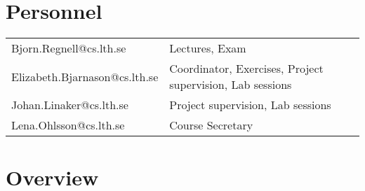 \documentclass[10pt,a4paper]{article}
\begin{document}
\section{Personnel}
\begin{flushleft}
\setlength{\tabcolsep}{0pt}
\begin{tabular}{p{} p{}}
Bjorn.Regnell@cs.lth.se & Lectures, Exam \\
Elizabeth.Bjarnason@cs.lth.se & Coordinator, Exercises, Project supervision, Lab sessions \\
Johan.Linaker@cs.lth.se & Project supervision, Lab sessions \\
Lena.Ohlsson@cs.lth.se & Course Secretary \\
\end{tabular}
\end{flushleft}




\newpage
\section{Overview}
\end{document}
